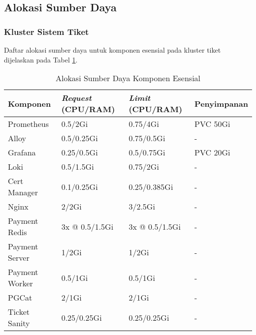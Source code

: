 \subsection{Alokasi Sumber Daya}

\subsubsection{Kluster Sistem Tiket}

Daftar alokasi sumber daya untuk komponen esensial pada kluster tiket dijelaskan pada Tabel \ref{tab:resource_allocation}.

\begin{table}[htpb]
    \centering
    \caption{Alokasi Sumber Daya Komponen Esensial}
    \label{tab:resource_allocation}
    \begin{tabular}{|l|l|l|l|}
        \hline
        \textbf{Komponen} & \textbf{\textit{Request} (CPU/RAM)} & \textbf{\textit{Limit} (CPU/RAM)} & \textbf{Penyimpanan} \\ \hline
        Prometheus        & 0.5/2Gi                             & 0.75/4Gi                          & PVC 50Gi             \\ \hline
        Alloy             & 0.5/0.25Gi                          & 0.75/0.5Gi                        & -                    \\ \hline
        Grafana           & 0.25/0.5Gi                          & 0.5/0.75Gi                        & PVC 20Gi             \\ \hline
        Loki              & 0.5/1.5Gi                           & 0.75/2Gi                          & -                    \\ \hline
        Cert Manager      & 0.1/0.25Gi                          & 0.25/0.385Gi                      & -                    \\ \hline
        Nginx             & 2/2Gi                               & 3/2.5Gi                           & -                    \\ \hline
        Payment Redis     & 3x @ 0.5/1.5Gi                      & 3x @ 0.5/1.5Gi                    & -                    \\ \hline
        Payment Server    & 1/2Gi                               & 1/2Gi                             & -                    \\ \hline
        Payment Worker    & 0.5/1Gi                             & 0.5/1Gi                           & -                    \\ \hline
        PGCat             & 2/1Gi                               & 2/1Gi                             & -                    \\ \hline
        Ticket Sanity     & 0.25/0.25Gi                         & 0.25/0.25Gi                       & -                    \\ \hline
    \end{tabular}
\end{table}

